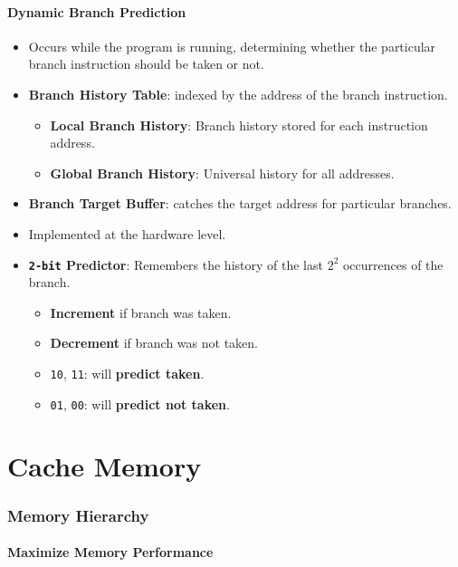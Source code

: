 \documentclass[12pt, letterpaper]{article}
\begin{document}
\subsection*{Dynamic Branch Prediction}

\begin{itemize}
  \item Occurs while the program is running, determining whether the
    particular branch instruction should be taken or not.
  \item \textbf{Branch History Table}: indexed by the address of the
    branch instruction.
    \begin{itemize}
      \item \textbf{Local Branch History}: Branch history stored for
        each instruction address.
      \item \textbf{Global Branch History}: Universal history for
        all addresses.
    \end{itemize}
  \item \textbf{Branch Target Buffer}: catches the target address for
    particular branches.
  \item Implemented at the hardware level.
  \item \textbf{\texttt{2-bit} Predictor}: Remembers the history of
    the last $ 2^2 $ occurrences of the branch.
    \begin{itemize}
      \item \textbf{Increment} if branch was taken.
      \item \textbf{Decrement} if branch was not taken.
      \item \texttt{10}, \texttt{11}: will \textbf{predict taken}.
      \item \texttt{01}, \texttt{00}: will \textbf{predict not taken}.
    \end{itemize}
\end{itemize}

\part*{Cache Memory}

\section*{Memory Hierarchy}

\subsection*{Maximize Memory Performance}
\end{document}
